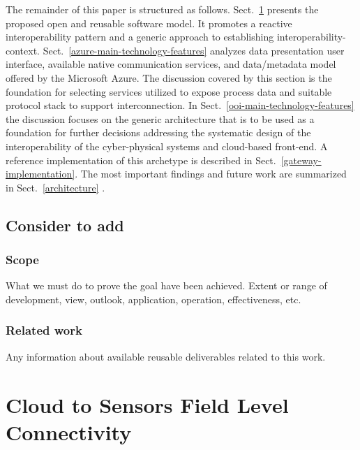 \documentclass{jacsart}
\begin{document}
The remainder of this paper is structured as follows. Sect.~\ref*{cloud-to-sensors-field-level-connectivity} presents the proposed open and reusable software model. It promotes a reactive interoperability pattern and a generic approach to establishing interoperability-context. Sect.~\ref*{azure-main-technology-features} analyzes data presentation user interface, available native communication services, and data/metadata model offered by the Microsoft Azure. The discussion covered by this section is the foundation for selecting services utilized to expose process data and suitable protocol stack to support interconnection. In Sect.~\ref*{ooi-main-technology-features} the discussion focuses on the generic architecture that is to be used as a foundation for further decisions addressing the systematic design of the interoperability of the cyber-physical systems and cloud-based front-end. A reference implementation of this archetype is described in Sect.~\ref*{gateway-implementation}. The most important findings and future work are summarized in Sect.~\ref*{architecture} .

\hypertarget{consider-to-add}{%
  \subsection{Consider to add}\label{consider-to-add}}

\hypertarget{scope}{%
  \subsubsection{Scope}\label{scope}}

What we must do to prove the goal have been achieved. Extent or range of
development, view, outlook, application, operation, effectiveness, etc.

\hypertarget{related-work}{%
  \subsubsection{Related work}\label{related-work}}

Any information about available reusable deliverables related to this
work.

\hypertarget{cloud-to-sensors-field-level-connectivity}{%
  \section{Cloud to Sensors Field Level Connectivity}\label{cloud-to-sensors-field-level-connectivity}}
\end{document}
